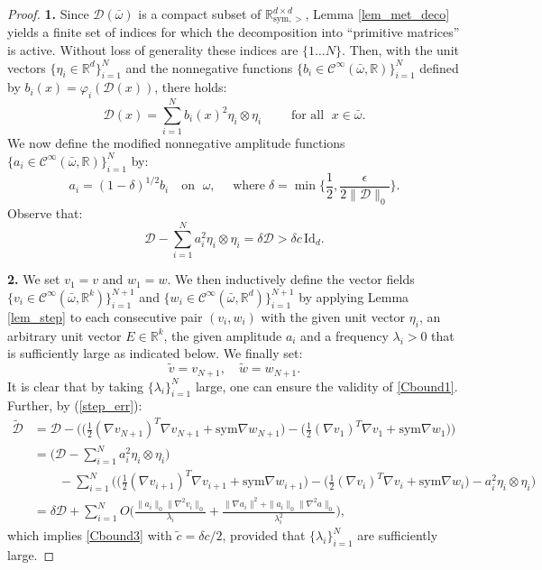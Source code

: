 \documentclass[reqno,twoside,11pt]{amsart}
\newcommand{\sym}{\mathrm{sym}}
\newcommand{\Id}{\mathrm{Id}}
\newcommand{\R}{\mathbb{R}}
\numberwithin{equation}{section}
\theoremstyle{plain}
\theoremstyle{definition}
\begin{document}
\begin{proof}
{\bf 1.} Since $\mathcal{D}(\bar\omega)$ is a compact subset of $\R^{d\times d}_{\sym,>}$, 
Lemma \ref{lem_met_deco} yields a finite set of indices for which the decomposition into ``primitive matrices'' is
active. Without loss of generality these indices are
$\{1\ldots N\}$. Then, with the unit vectors $\{\eta_i\in\R^d\}_{i=1}^N$ and the nonnegative functions
$\{b_i\in\mathcal{C}^\infty(\bar\omega,\R)\}_{i=1}^N$ defined by $b_i(x)=\varphi_i(\mathcal{D}(x))$, there holds: 
$$\mathcal{D}(x) = \sum_{i=1}^N b_i(x)^2 \eta_i\otimes\eta_i \qquad
\mbox{ for all }\; x\in\bar\omega.$$
We now define the modified nonnegative amplitude functions $\{a_i\in\mathcal{C}^\infty(\bar\omega,\R)\}_{i=1}^N$ by:
$$a_i = (1-\delta)^{1/2}b_i \quad\mbox{on }\;\omega, \quad\mbox{ where
}\; \delta = \min\big\{\frac{1}{2}, \frac{\epsilon}{2\|\mathcal{D}\|_0}\big\}.$$
Observe that:
$$\mathcal{D}-\sum_{i=1}^Na_i^2 \eta_i\otimes\eta_i = \delta\mathcal{D} >\delta c\,\Id_d.$$

\smallskip

{\bf 2.} We set $v_1 = v$ and $w_1=w$. We then inductively define the
vector fields $\{v_i\in\mathcal{C}^\infty(\bar \omega,\R^k)\}_{i=1}^{N+1}$ and
$\{w_i\in\mathcal{C}^\infty(\bar\omega,\R^d)\}_{i=1}^{N+1}$ by applying
Lemma \ref{lem_step} to each consecutive pair $(v_i, w_i)$ with the
given unit vector $\eta_i$, an arbitrary unit vector $E\in\R^k$, the
given amplitude $a_i$ and a frequency $\lambda_i>0$ that is sufficiently large as
indicated below. We finally set:
$$\tilde v = v_{N+1},\quad\tilde w = w_{N+1}.$$
It is clear that by taking $\{\lambda_i\}_{i=1}^N$ 
large, one can ensure the validity of \ref{Cbound1}. Further, by (\ref{step_err}):
\begin{equation*}
\begin{split}
\tilde{\mathcal{D}}& = \mathcal{D} - \Big(\big(\frac{1}{2}(\nabla
v_{N+1})^T\nabla v_{N+1} + \sym\nabla w_{N+1}\big) -
\big(\frac{1}{2}(\nabla v_1)^T\nabla v_1 + \sym\nabla w_1\big)\Big)\\  
& = \Big(\mathcal{D} - \sum_{i=1}^Na_i^2\eta_i\otimes\eta_i\Big) \\ &
\qquad - \sum_{i=1}^{N}\Big( \big(\frac{1}{2}(\nabla v_{i+1})^T\nabla v_{i+1} +
\sym\nabla w_{i+1}\big) - \big(\frac{1}{2}(\nabla v_i)^T\nabla v_i + \sym\nabla w_i\big)
-a_i^2\eta_i\otimes\eta_i\Big) \\ & = \delta\mathcal{D} + \sum_{i=1}^{N}
O\Big(\frac{\|a_i\|_0\|\nabla^2v_i\|_0}{\lambda_i} + \frac{\|\nabla
  a_i\|^2 +\|a_i\|_0\|\nabla^2a\|_0}{\lambda_i^2}\Big),
\end{split}
\end{equation*}
which implies \ref{Cbound3} with $\tilde c = \delta c/2$, provided
that $\{\lambda_i\}_{i=1}^N$ are sufficiently large.


\end{proof}
\end{document}
